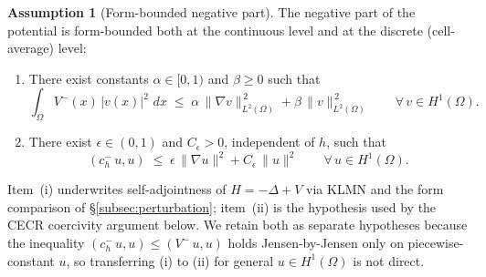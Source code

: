 \documentclass[11pt]{article}
\theoremstyle{plain}
\theoremstyle{definition}
\newtheorem{assumption}{Assumption}
\theoremstyle{remark}
\newcommand{\dx}{\,dx}
\begin{document}
\begin{assumption}[Form-bounded negative part]
\label{ass:form-bounded}\label{ass:kato-ch}
The negative part of the potential is form-bounded both at the
continuous level and at the discrete (cell-average) level:
\begin{enumerate}[label=(\roman*)]
\item There exist constants $\alpha\in[0,1)$ and $\beta\ge 0$ such that
\begin{equation}
\label{eq:form-bound}
  \int_\Omega V^-(x)\,|v(x)|^2\,\dx
  \;\le\; \alpha\,\|\nabla v\|_{L^2(\Omega)}^{\,2}
        + \beta\,\|v\|_{L^2(\Omega)}^{\,2}
  \qquad \forall\,v\in H^1(\Omega).
\end{equation}
\item There exist $\epsilon\in(0,1)$ and $C_\epsilon>0$, independent of
$h$, such that
\begin{equation}
\label{eq:kato-ch}
  (c_h^-\,u,u)
  \;\le\; \epsilon\,\|\nabla u\|^2 + C_\epsilon\,\|u\|^2
  \qquad \forall\,u\in H^1(\Omega).
\end{equation}
\end{enumerate}
Item~(i) underwrites self-adjointness of $H=-\Delta+V$ via KLMN and the
form comparison of \S\ref{subsec:perturbation}; item~(ii) is the
hypothesis used by the CECR coercivity argument below. We retain both
as separate hypotheses because the inequality
$(c_h^-\,u,u)\le(V^-\,u,u)$ holds Jensen-by-Jensen only on
piecewise-constant $u$, so transferring (i) to (ii) for general
$u\in H^1(\Omega)$ is not direct.
\end{assumption}
\end{document}
